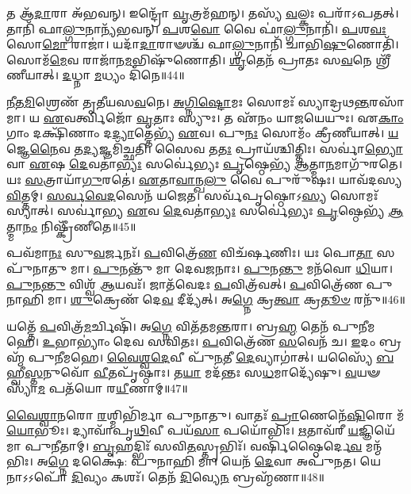 𑌤 𑌆᳴\-\ul{𑌦𑌾}\-𑌰𑌾 𑌅᳴𑌭𑌵𑌨𑍍।
𑌇𑌨𑍍𑌦𑍍𑌰𑍋᳴ \ul{𑌵𑍃}\-𑌤𑍍𑌰𑌮᳴𑌹𑌨𑍍।
𑌤𑌸𑍍𑌯᳴ \ul{𑌵}\-𑌲𑍍𑌕𑌃 𑌪𑌰𑌾᳴\-𑌽𑌪𑌤𑌤𑍍।
𑌤𑌾𑌨𑌿᳴ 𑌫𑌾\-\ul{𑌲𑍍𑌗𑍁}\-𑌨𑌾𑌨𑍍𑌯᳴𑌭𑌵𑌨𑍍।
\-\ul{𑌪}\-𑌶\-\ul{𑌵𑍋} 𑌵𑍈 𑌫𑌾॑\-\ul{𑌲𑍍𑌗𑍁}\-𑌨𑌾𑌨𑌿᳴।
\-\ul{𑌪}\-𑌶\-\ul{𑌵𑌃} 𑌸𑍋\-\ul{𑌮𑍋} 𑌰𑌾𑌜𑌾॑।
𑌯𑌦𑌾᳴\-\ul{𑌦𑌾}\-𑌰𑌾𑍟𑌶𑍍𑌚᳴ 𑌫𑌾\-\ul{𑌲𑍍𑌗𑍁}\-𑌨𑌾𑌨𑌿᳴ 𑌚𑌾𑌭𑌿\-\ul{𑌷𑍁}\-𑌣𑍋𑌤𑌿᳴।
𑌸𑍋𑌮᳴\-\ul{𑌮𑍇}\-𑌵 𑌰𑌾𑌜𑌾᳴𑌨\-\ul{𑌮}\-𑌭𑌿𑌷𑍁᳴𑌣𑍋𑌤𑌿।
\-\ul{𑌶𑍃}\-𑌤𑍇𑌨᳴ 𑌪𑍍𑌰𑌾𑌤𑌃 𑌸\-\ul{𑌵}\-𑌨𑍇 𑌶𑍍𑌰𑍀᳴𑌣𑍀𑌯𑌾𑌤𑍍।
\-\ul{𑌦}\-𑌧𑍍𑌨𑌾 \ul{𑌮}\-𑌧𑍍𑌯𑌂 𑌦𑌿᳴𑌨𑍇॥44॥

\-\ul{𑌨𑍀}\-\-\ul{𑌤}\-\-\ul{𑌮𑌿}\-𑌶𑍍𑌰𑍇𑌣᳴ 𑌤𑍃𑌤𑍀𑌯𑌸\-\ul{𑌵}\-𑌨𑍇।
\-\ul{𑌅}\-\-\ul{𑌗𑍍𑌨𑌿}\-\-\ul{𑌷𑍍𑌟𑍋}\-𑌮𑌃 𑌸𑍋𑌮𑌃᳴ 𑌸𑍍𑌯𑌾𑌦𑍍𑌰𑌥\-\ul{𑌨𑍍𑌤}\-𑌰\-𑌸𑌾᳴𑌮𑌾।
𑌯 \ul{𑌏}\-𑌵𑌰𑍍𑌤𑍍𑌵𑌿𑌜𑍋᳴ \ul{𑌵𑍃}\-𑌤𑌾𑌃 𑌸𑍍𑌯𑍁𑌃।
𑌤 𑌏᳴𑌨𑌂 𑌯𑌾𑌜𑌯𑍇𑌯𑍁𑌃।
𑌏\-\ul{𑌕𑌾𑌂} 𑌗𑌾𑌂 𑌦𑌕𑍍𑌷𑌿᳴𑌣𑌾𑌂 𑌦\-\ul{𑌦𑍍𑌯𑌾}\-𑌤𑍍𑌤𑍇𑌭𑍍𑌯᳴ \ul{𑌏}\-𑌵।
𑌪𑍁\-\ul{𑌨𑌃} 𑌸𑍋𑌮𑌂᳴ 𑌕𑍍𑌰𑍀𑌣𑍀𑌯𑌾𑌤𑍍।
\-\ul{𑌯}\-𑌜𑍍𑌞𑍇\-\ul{𑌨𑍈}\-𑌵 𑌤\-\ul{𑌦𑍍𑌯}\-𑌜𑍍𑌞𑌮𑌿᳴𑌚𑍍𑌛𑌤𑌿।
𑌸𑍈𑌵 𑌤\-\ul{𑌤𑌃} 𑌪𑍍𑌰𑌾𑌯᳴𑌶𑍍𑌚𑌿𑌤𑍍𑌤𑌿𑌃।
𑌸𑌰𑍍𑌵𑌾॑\-\ul{𑌭𑍍𑌯𑍋} 𑌵𑌾 \ul{𑌏}\-𑌷 \ul{𑌦𑍇}\-𑌵𑌤𑌾॑\-\ul{𑌭𑍍𑌯𑌃} 𑌸𑌰𑍍𑌵𑍇॑𑌭𑍍𑌯𑌃 \ul{𑌪𑍃}\-𑌷𑍍𑌠𑍇𑌭𑍍𑌯᳴ \ul{𑌆}\-𑌤𑍍𑌮𑌾\-\ul{𑌨}\-𑌮𑌾𑌗𑍁᳴𑌰𑌤𑍇।
𑌯𑌃 \ul{𑌸}\-𑌤𑍍𑌰𑌾𑌯𑌾᳴\-\ul{𑌗𑍁}\-𑌰𑌤𑍇॑।
\-\ul{𑌏}\-𑌤𑌾\-\ul{𑌵𑌾}\-𑌨𑍍𑌖\-\ul{𑌲𑍁} 𑌵𑍈 𑌪𑍁𑌰𑍁᳴𑌷𑌃।
𑌯𑌾𑌵᳴𑌦𑌸𑍍𑌯 \ul{𑌵𑌿}\-𑌤𑍍𑌤𑌮𑍍।
\-\ul{𑌸}\-\-\ul{𑌰𑍍𑌵}\-\-\ul{𑌵𑍇}\-\-\ul{𑌦}\-𑌸𑍇𑌨᳴ 𑌯𑌜𑍇𑌤।
𑌸𑌰𑍍𑌵᳴𑌪𑍃𑌷𑍍𑌠𑍋\-𑌽\-\ul{𑌸𑍍𑌯} 𑌸𑍋𑌮𑌃᳴ 𑌸𑍍𑌯𑌾𑌤𑍍।
𑌸𑌰𑍍𑌵𑌾॑𑌭𑍍𑌯 \ul{𑌏}\-𑌵 \ul{𑌦𑍇}\-𑌵𑌤𑌾॑\-\ul{𑌭𑍍𑌯𑌃} 𑌸𑌰𑍍𑌵𑍇॑𑌭𑍍𑌯𑌃 \ul{𑌪𑍃}\-𑌷𑍍𑌠𑍇𑌭𑍍𑌯᳴ \ul{𑌆}\-𑌤𑍍𑌮𑌾\-\ul{𑌨𑌂} 𑌨𑌿𑌷𑍍𑌕𑍍𑌰𑍀᳴𑌣𑍀𑌤𑍇॥45॥\anuvakamend[\-\ul{𑌉}\-𑌦𑍍𑌵𑌾𑌯᳴𑌤𑌿 𑌮𑌨𑍍𑌥𑍇𑌨𑍍𑌮𑌨𑍍𑌥𑌤𑍍𑌯𑌕𑍍𑌰𑌾𑌮\-\ul{𑌤𑍍𑌪}\-𑌰𑌾\-𑌽𑌪᳴𑌤\-\ul{𑌨𑍍𑌮}\-𑌧𑍍𑌯𑌨𑍍𑌦𑌿᳴𑌨 𑌆\-\ul{𑌗𑍁}\-𑌰\-\ul{𑌤𑍇} 𑌪𑌞𑍍𑌚᳴ 𑌚]

𑌪𑌵᳴𑌮𑌾\-\ul{𑌨𑌃} 𑌸𑍁\-\ul{𑌵}\-𑌰𑍍𑌜𑌨𑌃᳴।
\-\ul{𑌪}\-𑌵𑌿𑌤𑍍𑌰𑍇᳴\-\ul{𑌣} 𑌵𑌿𑌚᳴𑌰𑍍\mbox{}𑌷𑌣𑌿𑌃।
𑌯𑌃 𑌪𑍋\-\ul{𑌤𑌾} 𑌸 𑌪𑍁᳴𑌨𑌾𑌤𑍁 𑌮𑌾।
\-\ul{𑌪𑍁}\-𑌨𑌨𑍍𑌤𑍁᳴ 𑌮𑌾 𑌦𑍇𑌵\-\ul{𑌜}\-𑌨𑌾𑌃।
\-\ul{𑌪𑍁}\-𑌨\-\ul{𑌨𑍍𑌤𑍁} 𑌮𑌨᳴𑌵𑍋 \ul{𑌧𑌿}\-𑌯𑌾।
\-\ul{𑌪𑍁}\-𑌨\-\ul{𑌨𑍍𑌤𑍁} 𑌵𑌿𑌶𑍍𑌵᳴ \ul{𑌆}\-𑌯𑌵𑌃᳴।
𑌜𑌾𑌤᳴𑌵𑍇𑌦𑌃 \ul{𑌪}\-𑌵𑌿𑌤𑍍𑌰᳴𑌵𑌤𑍍।
\-\ul{𑌪}\-𑌵𑌿𑌤𑍍𑌰𑍇᳴𑌣 𑌪𑍁𑌨𑌾𑌹𑌿 𑌮𑌾।
\-\ul{𑌶𑍁}\-𑌕𑍍𑌰𑍇𑌣᳴ 𑌦𑍇\-\ul{𑌵} 𑌦𑍀𑌦𑍍𑌯᳴𑌤𑍍।
𑌅\-\ul{𑌗𑍍𑌨𑍇} 𑌕𑍍𑌰\-\ul{𑌤𑍍𑌵𑌾} 𑌕𑍍𑌰\-\ul{𑌤𑍂}\-\-\ul{𑍞} 𑌰𑌨𑍁᳴\-॥46॥

𑌯𑌤𑍍𑌤𑍇᳴ \ul{𑌪}\-𑌵𑌿𑌤𑍍𑌰᳴\-\ul{𑌮}\-𑌰𑍍𑌚𑌿𑌷𑌿᳴।
𑌅\-\ul{𑌗𑍍𑌨𑍇} 𑌵𑌿𑌤᳴𑌤𑌮\-\ul{𑌨𑍍𑌤}\-𑌰𑌾।
𑌬𑍍𑌰\-\ul{𑌹𑍍𑌮} 𑌤𑍇𑌨᳴ 𑌪𑍁𑌨𑍀𑌮𑌹𑍇।
\-\ul{𑌉}\-𑌭𑌾𑌭𑍍𑌯𑌾𑌂॑ 𑌦𑍇𑌵 𑌸𑌵𑌿𑌤𑌃।
\-\ul{𑌪}\-𑌵𑌿𑌤𑍍𑌰𑍇᳴𑌣 \ul{𑌸}\-𑌵𑍇𑌨᳴ 𑌚।
\-\ul{𑌇}\-𑌦𑌂 𑌬𑍍𑌰𑌹𑍍𑌮᳴ 𑌪𑍁𑌨𑍀𑌮𑌹𑍇।
\-\ul{𑌵𑍈}\-\-\ul{𑌶𑍍𑌵}\-\-\ul{𑌦𑍇}\-𑌵𑍀 𑌪𑍁᳴\-\ul{𑌨}\-𑌤𑍀 \ul{𑌦𑍇}\-𑌵𑍍𑌯𑌾𑌗𑌾॑𑌤𑍍।
𑌯𑌸𑍍𑌯𑍈᳴ \ul{𑌬}\-𑌹𑍍𑌵𑍀\-\ul{𑌸𑍍𑌤}\-𑌨𑍁𑌵𑍋᳴ \ul{𑌵𑍀}\-𑌤𑌪𑍃᳴𑌷𑍍𑌠𑌾𑌃।
𑌤\-\ul{𑌯𑌾} 𑌮𑌦᳴𑌨𑍍𑌤𑌃 𑌸\-\ul{𑌧}\-𑌮𑌾𑌦𑍍𑌯𑍇᳴𑌷𑍁।
\-\ul{𑌵}\-𑌯𑍟 𑌸𑍍𑌯𑌾᳴\-\ul{𑌮} 𑌪𑌤᳴𑌯𑍋 𑌰\-\ul{𑌯𑍀}\-𑌣𑌾𑌮𑍍॥47॥

\-\ul{𑌵𑍈}\-\-\ul{𑌶𑍍𑌵𑌾}\-\-\ul{𑌨}\-𑌰𑍋 \ul{𑌰}\-𑌶𑍍𑌮𑌿𑌭𑌿᳴𑌰𑍍𑌮𑌾 𑌪𑍁𑌨𑌾𑌤𑍁।
𑌵𑌾𑌤𑌃᳴ \ul{𑌪𑍍𑌰𑌾}\-𑌣𑍇𑌨𑍇᳴\-\ul{𑌷𑌿}\-𑌰𑍋 𑌮᳴\-\ul{𑌯𑍋}\-𑌭𑍂𑌃।
𑌦𑍍𑌯𑌾𑌵𑌾᳴𑌪𑍃\-\ul{𑌥𑌿}\-𑌵𑍀 𑌪𑌯᳴\-\ul{𑌸𑌾} 𑌪𑌯𑍋᳴𑌭𑌿𑌃।
\-\ul{𑌋}\-𑌤𑌾𑌵᳴𑌰𑍀 \ul{𑌯}\-𑌜𑍍𑌞𑌿𑌯𑍇᳴ 𑌮𑌾 𑌪𑍁𑌨𑍀𑌤𑌾𑌮𑍍।
\-\ul{𑌬𑍃}\-𑌹𑌦𑍍𑌭𑌿𑌃᳴ 𑌸𑌵𑌿\-\ul{𑌤}\-𑌸𑍍𑌤𑍃𑌭𑌿𑌃᳴।
𑌵𑌰𑍍\mbox{}𑌷𑌿᳴𑌷𑍍𑌠𑍈𑌰𑍍𑌦𑍇\-\ul{𑌵} 𑌮𑌨𑍍𑌮᳴𑌭𑌿𑌃।
𑌅\-\ul{𑌗𑍍𑌨𑍇} 𑌦𑌕𑍍𑌷𑍈॑: 𑌪𑍁𑌨𑌾𑌹𑌿 𑌮𑌾।
𑌯𑍇𑌨᳴ \ul{𑌦𑍇}\-𑌵𑌾 𑌅𑌪𑍁᳴𑌨𑌤।
𑌯𑍇𑌨𑌾𑌽𑌽𑌪𑍋᳴ \ul{𑌦𑌿}\-𑌵𑍍𑌯𑌂 𑌕𑌶𑌃᳴।
𑌤𑍇𑌨᳴ \ul{𑌦𑌿}\-𑌵𑍍𑌯𑍇\-\ul{𑌨} 𑌬𑍍𑌰𑌹𑍍𑌮᳴𑌣𑌾॥48॥

